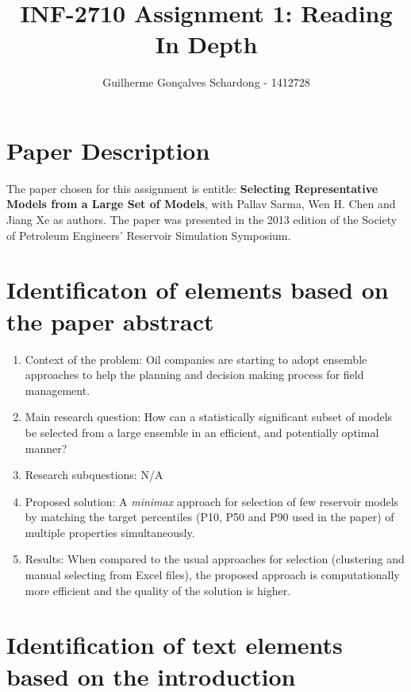 \documentclass[]{report}
\title{INF-2710 Assignment 1: Reading In Depth}
\author{Guilherme Gonçalves Schardong - 1412728}
\begin{document}
\maketitle

\section{Paper Description}
The paper chosen for this assignment is entitle: \textbf{Selecting Representative Models from a Large Set of Models}, with Pallav Sarma, Wen H. Chen and Jiang Xe as authors. The paper was presented in the 2013 edition of the Society of Petroleum Engineers' Reservoir Simulation Symposium.

\section{Identificaton of elements based on the paper abstract}

\begin{enumerate}
\item Context of the problem: Oil companies are starting to adopt ensemble approaches to help the planning and decision making process for field management.
\item Main research question: How can a statistically significant subset of models be selected from a large ensemble in an efficient, and potentially optimal manner?
\item Research subquestions: N/A
\item Proposed solution: A \textit{minimax} approach for selection of few reservoir models by matching the target percentiles (P10, P50 and P90 used in the paper) of multiple properties simultaneously.
\item Results: When compared to the usual approaches for selection (clustering and manual selecting from Excel files), the proposed approach is computationally more efficient and the quality of the solution is higher.
\end{enumerate}

\section{Identification of text elements based on the introduction}
\end{document}
